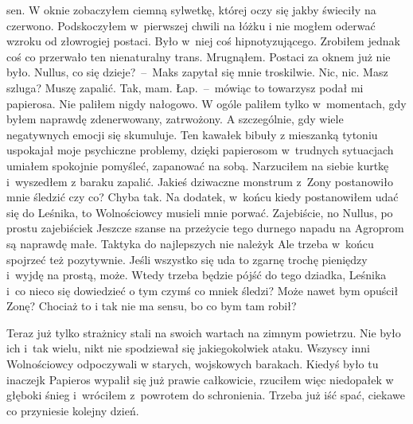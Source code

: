 \documentclass[../MAIN.tex]{subfiles}
\begin{document}
sen. W oknie zobaczyłem ciemną sylwetkę, której oczy się jakby
świeciły na czerwono. Podskoczyłem w~pierwszej chwili na łóżku
i nie mogłem oderwać wzroku od złowrogiej postaci. Było w~niej
coś hipnotyzującego. Zrobiłem jednak coś co przerwało ten
nienaturalny trans. Mrugnąłem. Postaci za oknem już nie było.
\xx Nullus, co się dzieje?~--~Maks zapytał się mnie troskilwie.
\xx Nic, nic. Masz szluga? Muszę zapalić.
\xx Tak, mam. Łap.~--~mówiąc to towarzysz podał mi papierosa.
\qd
Nie paliłem nigdy nałogowo. W ogóle paliłem tylko w~momentach,
gdy byłem naprawdę zdenerwowany, zatrwożony. A szczególnie, gdy
wiele negatywnych emocji się skumuluje. Ten kawałek bibuły z
mieszanką tytoniu uspokajał moje psychiczne problemy, dzięki
papierosom w~trudnych sytuacjach umiałem spokojnie pomyśleć,
zapanować na sobą. Narzuciłem na siebie kurtkę i~wyszedłem z
baraku zapalić. Jakieś dziwaczne monstrum z~Zony postanowiło
mnie śledzić czy co? Chyba tak. Na dodatek, w~końcu kiedy
postanowiłem udać się do Leśnika, to Wolnościowcy musieli mnie
porwać. Zajebiście, no Nullus, po prostu zajebiście\3k Jeszcze
szanse na przeżycie tego durnego napadu na Agroprom są naprawdę
małe. Taktyka do najlepszych nie należy\3k Ale trzeba w~końcu
spojrzeć też pozytywnie. Jeśli wszystko się uda to zgarnę
trochę pieniędzy i~wyjdę na prostą, może. Wtedy trzeba będzie
pójść do tego dziadka, Leśnika i~co nieco się dowiedzieć o tym
czymś co mnie\3k śledzi? Może nawet bym opuścił Zonę? Chociaż
to
i tak nie ma sensu, bo co bym tam robił?

Teraz już tylko strażnicy stali na swoich wartach na zimnym
powietrzu. Nie było ich i~tak wielu, nikt nie spodziewał się
jakiegokolwiek ataku. Wszyscy inni Wolnościowcy odpoczywali w
starych, wojskowych barakach. Kiedyś było tu inaczej\3k
Papieros
wypalił się już prawie całkowicie, rzuciłem więc niedopałek w
głęboki śnieg i~wróciłem z~powrotem do schronienia. Trzeba już
iść spać, ciekawe co przyniesie kolejny dzień.
\end{document}
